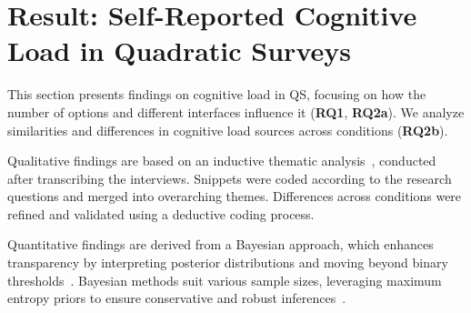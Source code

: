  \section{Result: Self-Reported Cognitive Load in Quadratic Surveys}
\label{sec:cog}
This section presents findings on cognitive load in QS, focusing on how the number of options and different interfaces influence it (\textbf{RQ1}, \textbf{RQ2a}). We analyze similarities and differences in cognitive load sources across conditions (\textbf{RQ2b}).

Qualitative findings are based on an inductive thematic analysis~\cite{olsonWaysKnowingHCI2014}, conducted after transcribing the interviews. Snippets were coded according to the research questions and merged into overarching themes. Differences across conditions were refined and validated using a deductive coding process.

Quantitative findings are derived from a Bayesian approach, which enhances transparency by interpreting posterior distributions and moving beyond binary thresholds~\cite{kay2016researcher}. Bayesian methods suit various sample sizes, leveraging maximum entropy priors to ensure conservative and robust inferences~\cite{mcelreath2018statistical}.


